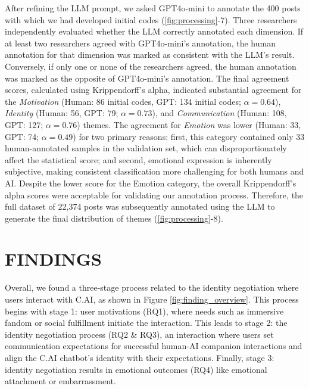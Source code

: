 \documentclass[sigconf, nonacm]{acmart}
\newcommand{\datamethodfinding}[1]{{\color{black}{#1}}}
\begin{document}
After refining the LLM prompt, we asked GPT4o-mini to annotate the 400 posts with which we had developed initial codes (\autoref{fig:processing}-7). Three researchers independently evaluated whether the LLM correctly annotated each dimension. If at least two researchers agreed with GPT4o-mini's annotation, the human annotation for that dimension was marked as consistent with the LLM's result. Conversely, if only one or none of the researchers agreed, the human annotation was marked as the opposite of GPT4o-mini's annotation. The final agreement scores, calculated using Krippendorff's alpha, indicated substantial agreement for the \textit{Motivation} (Human: 86 initial codes, GPT: 134 initial codes; $\alpha=0.64$), \textit{Identity} (Human: 56, GPT: 79; $\alpha=0.73$), and \textit{Communication} (Human: 108, GPT: 127; $\alpha=0.76$) themes. The agreement for \textit{Emotion} was lower (Human: 33, GPT: 74; $\alpha=0.49$) for two primary reasons: first, this category contained only 33 human-annotated samples in the validation set, which can disproportionately affect the statistical score; and second, emotional expression is inherently subjective, making consistent classification more challenging for both humans and AI. Despite the lower score for the Emotion category, the overall Krippendorff's alpha scores were acceptable for validating our annotation process. Therefore, the full dataset of 22,374 posts was subsequently annotated using the LLM to generate the final distribution of themes (\autoref{fig:processing}-8). \datamethodfinding{To illustrate these themes in our findings, we randomly sampled posts from the final dataset and selected representative quotes in those posts, given the research team's discussions and consensus to ensure they accurately reflected the corpus.}


\section{FINDINGS} 
Overall, \datamethodfinding{guided by the theoretical lens of INT,} we found a three-stage process related to the identity negotiation where users interact with C.AI, as shown in Figure \ref{fig:finding_overview}. This process begins with stage 1: user motivations (RQ1), where needs such as immersive fandom or social fulfillment initiate the interaction. This leads to stage 2: the identity negotiation process (RQ2 \& RQ3), an interaction where users set communication expectations for successful human-AI companion interactions and align the C.AI chatbot's identity with their expectations. Finally, stage 3: identity negotiation results in emotional outcomes (RQ4) like emotional attachment or embarrassment.
\end{document}
